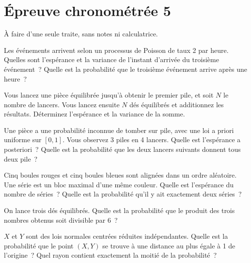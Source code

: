 \chapter{Épreuve chronométrée 5}\label{ch:iv1:timed-test-5}

\begin{ivtrains}
À faire d'une seule traite, sans notes ni calculatrice.
\end{ivtrains}


\begin{question}\label{iq:iv1:timed-test-5:1}
Les événements arrivent selon un processus de Poisson de taux 2 par heure. Quelles sont l'espérance et la variance de l'instant d'arrivée du troisième événement~? Quelle est la probabilité que le troisième événement arrive après une heure~?
\end{question}

\begin{question}\label{iq:iv1:timed-test-5:2}
Vous lancez une pièce équilibrée jusqu'à obtenir le premier pile, et soit $N$ le nombre de lancers. Vous lancez ensuite $N$ dés équilibrés et additionnez les résultats. Déterminez l'espérance et la variance de la somme.
\end{question}

\begin{question}\label{iq:iv1:timed-test-5:3}
Une pièce a une probabilité inconnue de tomber sur pile, avec une loi a priori uniforme sur $[0, 1]$. Vous observez 3 piles en 4 lancers. Quelle est l'espérance a posteriori~? Quelle est la probabilité que les deux lancers suivants donnent tous deux pile~?
\end{question}

\begin{question}\label{iq:iv1:timed-test-5:4}
Cinq boules rouges et cinq boules bleues sont alignées dans un ordre aléatoire. Une série est un bloc maximal d'une même couleur. Quelle est l'espérance du nombre de séries~? Quelle est la probabilité qu'il y ait exactement deux séries~?
\end{question}

\begin{question}\label{iq:iv1:timed-test-5:5}
On lance trois dés équilibrés. Quelle est la probabilité que le produit des trois nombres obtenus soit divisible par 6~?
\end{question}

\begin{question}\label{iq:iv1:timed-test-5:6}
$X$ et $Y$ sont des lois normales centrées réduites indépendantes. Quelle est la probabilité que le point $(X, Y)$ se trouve à une distance au plus égale à 1 de l'origine~? Quel rayon contient exactement la moitié de la probabilité~?
\end{question}

